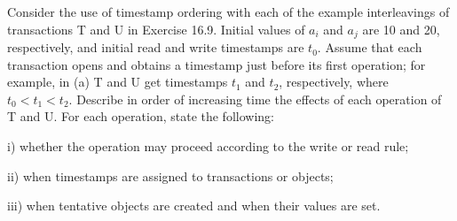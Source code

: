\documentclass{article}
\begin{document}
\begin{tcolorbox}[colback=blue!5!white,colframe=blue!75!black,title=Problem 16.19]
        Consider the use of timestamp ordering with each of the example interleavings of
        transactions T and U in Exercise 16.9. Initial values of $a_i$ and $a_j$ are 10 and 20,
        respectively, and initial read and write timestamps are $t_0$. Assume that each transaction
        opens and obtains a timestamp just before its first operation; for example, in (a) T and U
        get timestamps $t_1$ and $t_2$, respectively, where $t_0 < t_1 < t_2.$ Describe in order of increasing
        time the effects of each operation of T and U. For each operation, state the following:
        \begin{enumerate}i) whether the operation may proceed according to the write or read rule;
        \end{enumerate}
        \begin{enumerate}ii) when timestamps are assigned to transactions or objects;
        \end{enumerate}
        \begin{enumerate}iii) when tentative objects are created and when their values are set.
        \end{enumerate}
\end{tcolorbox}
\end{document}
